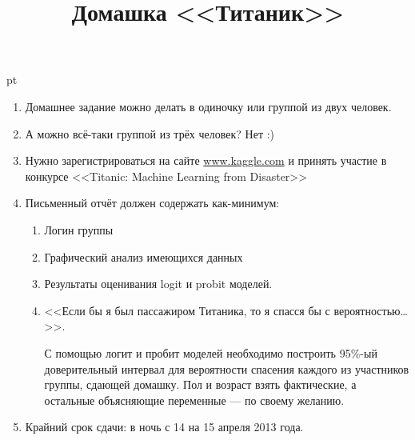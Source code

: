 \documentclass[pdftex,12pt,a4paper]{article}
\title{Домашка <<Титаник>>}
\date{}
\begin{document}
\maketitle

 pt %


\begin{enumerate}
\item Домашнее задание можно делать в одиночку или группой из двух человек.
\item А можно всё-таки группой из трёх человек? Нет :)
\item Нужно зарегистрироваться на сайте \url{www.kaggle.com} и принять участие в конкурсе <<Titanic: Machine Learning from Disaster>> 
\item Письменный отчёт  должен содержать как-минимум:
\begin{enumerate}
\item Логин группы
\item Графический анализ имеющихся данных
\item Результаты оценивания logit и probit моделей.
\item <<Если бы я был пассажиром Титаника, то я спасся бы с вероятностью\ldots>>. 

С помощью логит и пробит моделей необходимо построить 95\%-ый доверительный интервал для вероятности спасения каждого из участников группы, сдающей домашку. Пол и возраст взять фактические, а остальные объясняющие переменные --- по своему желанию.
\end{enumerate}
\item Крайний срок сдачи: в ночь с 14 на 15 апреля 2013 года.
\end{enumerate}





 
\end{document}
